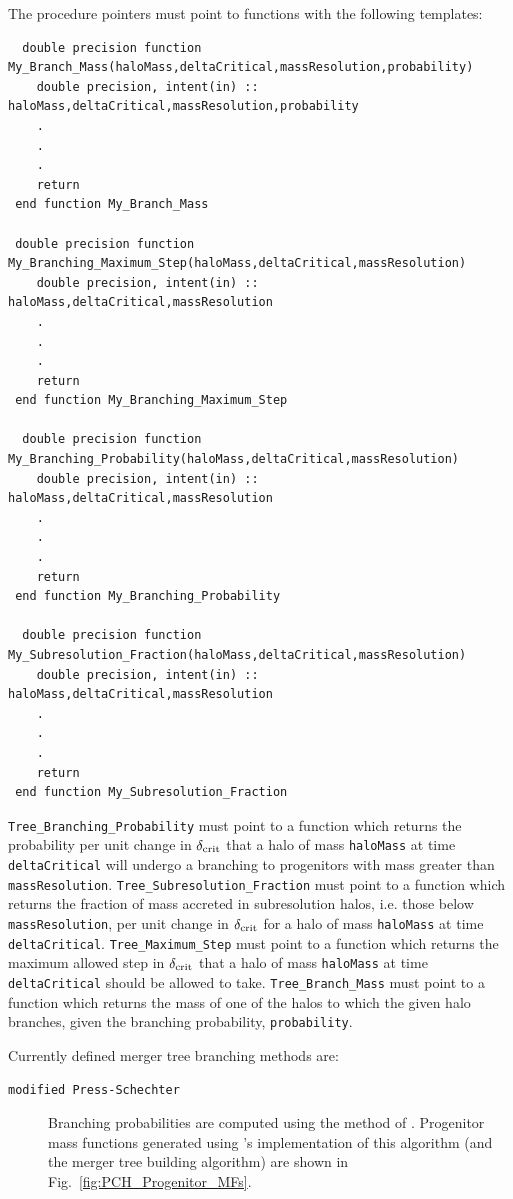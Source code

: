 The procedure pointers must point to functions with the following templates:
\begin{verbatim}
  double precision function My_Branch_Mass(haloMass,deltaCritical,massResolution,probability)
    double precision, intent(in) :: haloMass,deltaCritical,massResolution,probability
    .
    .
    .
    return
 end function My_Branch_Mass

 double precision function My_Branching_Maximum_Step(haloMass,deltaCritical,massResolution)
    double precision, intent(in) :: haloMass,deltaCritical,massResolution
    .
    .
    .
    return
 end function My_Branching_Maximum_Step

  double precision function My_Branching_Probability(haloMass,deltaCritical,massResolution)
    double precision, intent(in) :: haloMass,deltaCritical,massResolution
    .
    .
    .
    return
 end function My_Branching_Probability

  double precision function My_Subresolution_Fraction(haloMass,deltaCritical,massResolution)
    double precision, intent(in) :: haloMass,deltaCritical,massResolution
    .
    .
    .
    return
 end function My_Subresolution_Fraction
\end{verbatim}
{\tt Tree\_Branching\_Probability} must point to a function which returns the probability per unit change in $\delta_{\rm crit}$ that a halo of mass {\tt haloMass} at time {\tt deltaCritical} will undergo a branching to progenitors with mass greater than {\tt massResolution}. {\tt Tree\_Subresolution\_Fraction} must point to a function which returns the fraction of mass accreted in subresolution halos, i.e. those below {\tt massResolution}, per unit change in $\delta_{\rm crit}$ for a halo of mass {\tt haloMass} at time {\tt deltaCritical}. {\tt Tree\_Maximum\_Step} must point to a function which returns the maximum allowed step in $\delta_{\rm crit}$ that a halo of mass {\tt haloMass} at time {\tt deltaCritical} should be allowed to take. {\tt Tree\_Branch\_Mass} must point to a function which returns the mass of one of the halos to which the given halo branches, given the branching probability, {\tt probability}.

Currently defined merger tree branching methods are:
\begin{description}
 \item [{\tt modified Press-Schechter}] Branching probabilities are computed using the method of \cite{parkinson_generating_2008}. Progenitor mass functions generated using \glc's implementation of this algorithm (and the \cite{cole_hierarchical_2000} merger tree building algorithm) are shown in Fig.~\ref{fig:PCH_Progenitor_MFs}.
\end{description}

